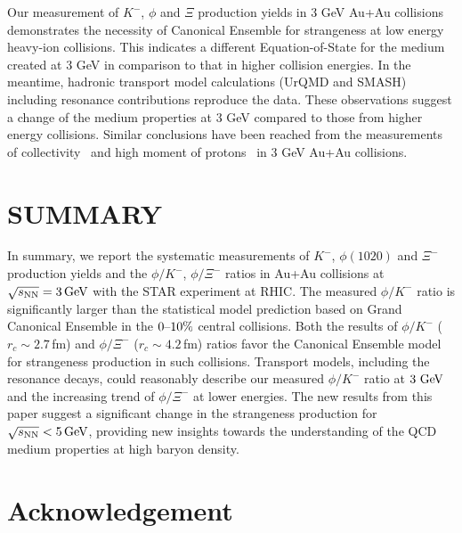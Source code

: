 \documentclass[aps,tightenlines,superscriptaddress,twocolumn]{revtex4-1}
\begin{document}
Our measurement of $K^-$, $\phi$ and $\Xi$ production yields in 3 GeV Au+Au collisions demonstrates the necessity of Canonical Ensemble for strangeness at low energy heavy-ion collisions. This indicates a different Equation-of-State for the medium created at 3 GeV in comparison to that in higher collision energies. In the meantime,  hadronic transport model calculations (UrQMD and SMASH) including resonance contributions reproduce the data. These observations suggest a change of the medium properties at 3 GeV compared to those from higher energy collisions. Similar conclusions have been reached from the measurements of collectivity~\cite{STAR:2021yiu} and high moment of protons~\cite{STAR:2021fge} in 3 GeV Au+Au collisions.

\section{SUMMARY}
\label{summary}

In summary, we report the systematic measurements of $K^-$, $\phi(1020)$ and $\Xi^{-}$ production yields and the $\phi/K^-$, $\phi/\Xi^-$ ratios in Au+Au collisions at ${\sqrt{s_{\rm NN}} = \rm{3\,GeV}}$ with the STAR experiment at RHIC. The measured $\phi/K^-$ ratio is significantly larger than the statistical model prediction based on Grand Canonical Ensemble in the $\textup{0--10\%}$ central collisions. Both the results of $\phi/K^-$ ($r_c \sim 2.7$\,fm) and $\phi/\Xi^-$ ($r_c \sim 4.2$\,fm) ratios favor the Canonical Ensemble model for strangeness production in such collisions. Transport models, including the resonance decays, could reasonably describe our measured $\phi/K^-$ ratio at $\textup{3 GeV}$ and the increasing trend of $\phi/\Xi^-$ at lower energies. 
The new results from this paper suggest a significant change in the strangeness production for ${\sqrt{s_{\rm NN}} < \rm{5\,GeV}}$, providing new insights towards the understanding of the QCD medium properties at high baryon density. 


\section{Acknowledgement}
\label{acknowledgement}
\end{document}
